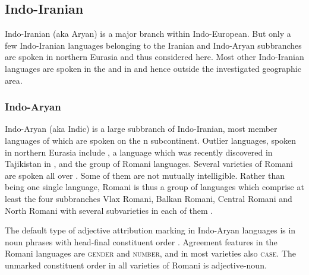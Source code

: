 \subsection{Indo-Iranian}
Indo-Iranian (aka Aryan) is a major branch within Indo-European. But only a few Indo-Iranian languages belonging to the Iranian and Indo-Aryan subbranches are spoken in northern Eurasia and thus considered here. Most other Indo-Iranian languages are spoken in the  and in  and hence outside the investigated geographic area. 

\subsubsection{Indo-Aryan}
Indo-Aryan (aka Indic) is a large subbranch of Indo-Iranian, most member languages of which are spoken on the n subcontinent. Outlier languages, spoken in northern Eurasia include , a language which was recently discovered in Tajikistan in  \cite[22]{masica1991}, and the group of Romani languages. Several varieties of Romani are spoken all over . Some of them are not mutually intelligible. Rather than being one single language, Romani is thus a group of languages which comprise at least the four subbranches Vlax Romani, Balkan Romani, Central Romani and North Romani with several subvarieties in each of them \citep[2–3]{halwachs-etal2002}.

The default type of adjective attribution marking in Indo-Aryan languages is  in noun phrases with head-final constituent order \cite[369]{masica1991}. Agreement features in the Romani languages are \textsc{gender} and \textsc{number}, and in most varieties also \textsc{case}. The unmarked constituent order in all varieties of Romani is adjective-noun.

